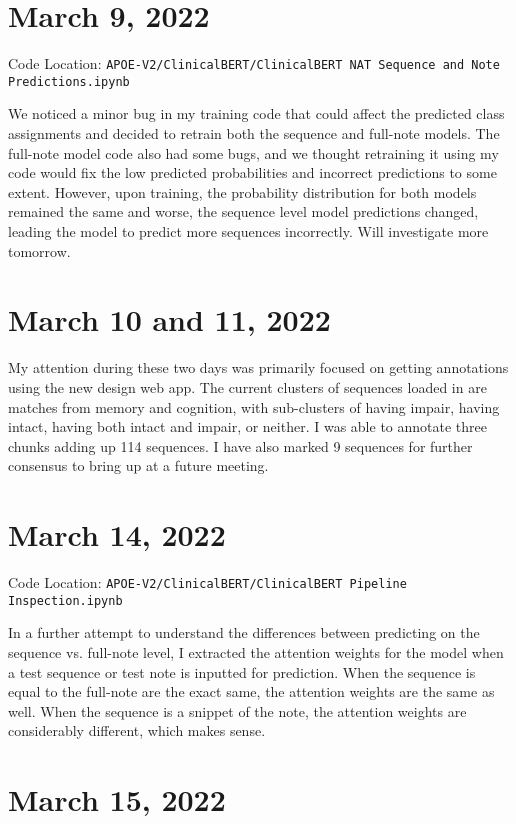 \documentclass[11pt,letterpaper]{article}
\begin{document}
\section{March 9, 2022}

Code Location: \texttt{APOE-V2/ClinicalBERT/ClinicalBERT NAT Sequence and Note Predictions.ipynb}

We noticed a minor bug in my training code that could affect the predicted class assignments and decided to retrain both the sequence and full-note models. The full-note model code also had some bugs, and we thought retraining it using my code would fix the low predicted probabilities and incorrect predictions to some extent. However, upon training, the probability distribution for both models remained the same and worse, the sequence level model predictions changed, leading the model to predict more sequences incorrectly. Will investigate more tomorrow.

\section{March 10 and 11, 2022}

My attention during these two days was primarily focused on getting annotations using the new design web app. The current clusters of sequences loaded in are matches from memory and cognition, with sub-clusters of having impair, having intact, having both intact and impair, or neither. I was able to annotate three chunks adding up 114 sequences. I have also marked 9 sequences for further consensus to bring up at a future meeting.

\section{March 14, 2022}

Code Location: \texttt{APOE-V2/ClinicalBERT/ClinicalBERT Pipeline Inspection.ipynb}

In a further attempt to understand the differences between predicting on the sequence vs. full-note level, I extracted the attention weights for the model when a test sequence or test note is inputted for prediction. When the sequence is equal to the full-note are the exact same, the attention weights are the same as well. When the sequence is a snippet of the note, the attention weights are considerably different, which makes sense. 

\section{March 15, 2022}
\end{document}
